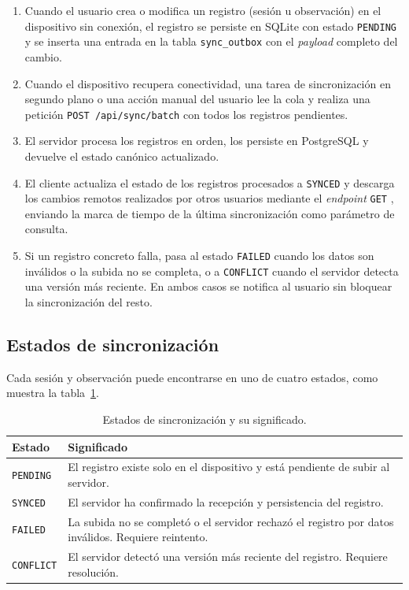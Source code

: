 \begin{enumerate}
  \item Cuando el usuario crea o modifica un registro (sesión u observación) en el
    dispositivo sin conexión, el registro se persiste en SQLite con estado
    \texttt{PENDING} y se inserta una entrada en la tabla \texttt{sync\_outbox} con el
    \textit{payload} completo del cambio.
  \item Cuando el dispositivo recupera conectividad, una tarea de sincronización
    en segundo plano o una acción manual del usuario lee la cola y realiza una petición
    \texttt{POST /api/sync/batch} con todos los registros pendientes.
  \item El servidor procesa los registros en orden, los persiste en PostgreSQL y
    devuelve el estado canónico actualizado.
  \item El cliente actualiza el estado de los registros procesados a
    \texttt{SYNCED} y descarga los cambios remotos realizados por otros usuarios
    mediante el \textit{endpoint} \texttt{GET} , enviando la marca de
    tiempo de la última sincronización como parámetro de consulta.
  \item Si un registro concreto falla, pasa al estado \texttt{FAILED} cuando los datos
    son inválidos o la subida no se completa, o a \texttt{CONFLICT} cuando el servidor
    detecta una versión más reciente. En ambos casos se notifica al usuario sin
    bloquear la sincronización del resto.
\end{enumerate}

\subsection{Estados de sincronización}

Cada sesión y observación puede encontrarse en uno de cuatro estados, como muestra
la tabla~\ref{tab:sync_states}.

\begin{table}[H]
  \centering
  \caption{Estados de sincronización y su significado.}
  \label{tab:sync_states}
  \begin{tabularx}{\textwidth}{lX}
    \toprule
    \textbf{Estado} & \textbf{Significado} \\
    \midrule
    \texttt{PENDING}  & El registro existe solo en el dispositivo y está pendiente de
                        subir al servidor. \\
    \texttt{SYNCED}   & El servidor ha confirmado la recepción y persistencia del
                        registro. \\
    \texttt{FAILED}   & La subida no se completó o el servidor rechazó el registro por
                        datos inválidos. Requiere reintento. \\
    \texttt{CONFLICT} & El servidor detectó una versión más reciente del registro.
                        Requiere resolución. \\
    \bottomrule
  \end{tabularx}
\end{table}

